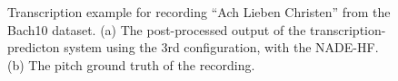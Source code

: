 \begin{figure}[t]
 \caption{Transcription example for recording ``Ach Lieben Christen'' from the Bach10 dataset. (a) The post-processed output of the transcription-predicton system using the 3rd configuration, with the NADE-HF. (b) The pitch ground truth of the recording.}
 \label{fig:Transcription}
\end{figure}

